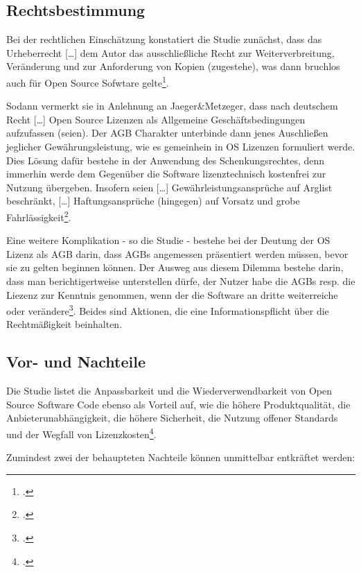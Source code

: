 \documentclass[DIV=calc,BCOR=5mm,11pt,headings=small,oneside,abstract=true, toc=bib]{scrartcl}
\begin{document}
\subsection{Rechtsbestimmung}

Bei der rechtlichen Einschätzung konstatiert die Studie zunächst, dass
\glqq{}das Urheberrecht [\ldots] dem Autor das ausschließliche Recht zur
Weiterverbreitung, Veränderung und zur Anforderung von Kopien
(zugestehe)\grqq{}, was dann bruchlos auch für Open Source Sofwtare
gelte\footcite[vgl.][23]{RenVetRexKet2005a}.

Sodann vermerkt sie in Anlehnung an Jaeger\&Metzeger, dass \glqq{}nach
deutschem Recht [\ldots] Open Source Lizenzen als Allgemeine
Geschäftsbedingungen aufzufassen (seien)\grqq{}. Der AGB Charakter
unterbinde dann jenes Auschließen jeglicher Gewährungsleistung, wie es
gemeinhein in OS Lizenzen formuliert werde. Dies Lösung dafür bestehe in der
Anwendung des \glqq{}Schenkungsrechtes\grqq{}, denn immerhin werde dem Gegenüber
die Software lizenztechnisch \glqq{}kostenfrei\grqq{} zur
\glqq{}Nutzung\grqq{} übergeben. Insofern seien
\glqq{}[\ldots] Gewährleistungsansprüche auf Arglist beschränkt\grqq{},
\glqq{}[\ldots] Haftungsansprüche (hingegen) auf Vorsatz und grobe
Fahrlässigkeit\grqq{}\footcite[vgl.][23]{RenVetRexKet2005a}.

Eine weitere Komplikation - so die Studie - bestehe bei der Deutung der OS
Lizenz als AGB darin, dass AGBs angemessen präsentiert werden müssen, bevor sie
zu gelten beginnen können. Der Ausweg aus diesem Dilemma bestehe darin, dass man
berichtigertweise \glqq{}unterstellen\grqq{} dürfe, der Nutzer habe die AGBs
resp. die Liezenz zur Kenntnis genommen, wenn der die Software an dritte
weiterreiche oder verändere\glqq{}\footcite[vgl.][23]{RenVetRexKet2005a}. Beides
sind Aktionen, die eine Informationspflicht über die Rechtmäßigkeit beinhalten.

\subsection{Vor- und Nachteile}
Die Studie listet die \glqq{}Anpassbarkeit\grqq{} und die
\glqq{}Wiederverwendbarkeit\grqq{} von Open Source Software Code ebenso als
Vorteil auf, wie die \glqq{}höhere Produktqualität\grqq{}, die
\glqq{}Anbieterunabhängigkeit\grqq{}, die \glqq{}höhere Sicherheit\grqq{}, die
Nutzung \glqq{}offener Standards\grqq{} und der \glqq{}Wegfall von
Lizenzkosten\grqq{}\footcite[vgl.][16f]{RenVetRexKet2005a}.

Zumindest zwei der behaupteten Nachteile können unmittelbar entkräftet
werden:
\end{document}
